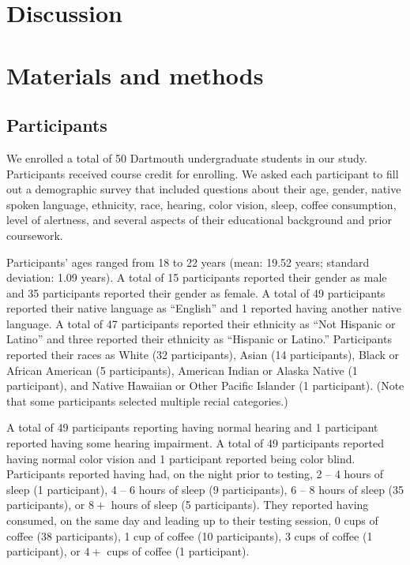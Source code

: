 \documentclass[10pt]{article}
\begin{document}
\section*{Discussion}

\section*{Materials and methods}

\subsection*{Participants}

We enrolled a total of 50 Dartmouth undergraduate students in our study.
Participants received course credit for enrolling. We asked each participant to
fill out a demographic survey that included questions about their age, gender,
native spoken language, ethnicity, race, hearing, color vision, sleep, coffee
consumption, level of alertness, and several aspects of their educational
background and prior coursework.

Participants' ages ranged from 18 to 22 years (mean: 19.52 years;
standard deviation: 1.09 years). A total of 15 participants reported
their gender as male and 35 participants reported their gender as
female. A total of 49 participants reported their native language as
``English'' and 1 reported having another native language. A total of
47 participants reported their ethnicity as ``Not Hispanic or Latino''
and three reported their ethnicity as ``Hispanic or Latino.''
Participants reported their races as White (32 participants), Asian
(14 participants), Black or African American (5 participants),
American Indian or Alaska Native (1 participant), and Native Hawaiian or
Other Pacific Islander (1 participant). (Note that some participants
selected multiple recial categories.)

A total of 49 participants reporting having normal hearing and 1
participant reported having some hearing impairment. A total of 49
participants reported having normal color vision and 1 participant
reported being color blind.  Participants reported having had, on the
night prior to testing, 2 -- 4 hours of sleep (1 participant), 4 -- 6
hours of sleep (9 participants), 6 -- 8 hours of sleep (35
participants), or $8+$ hours of sleep (5 participants). They reported
having consumed, on the same day and leading up to their testing
session, 0 cups of coffee (38 participants), 1 cup of coffee (10
participants), 3 cups of coffee (1 participant), or $4+$ cups of
coffee (1 participant).
\end{document}
